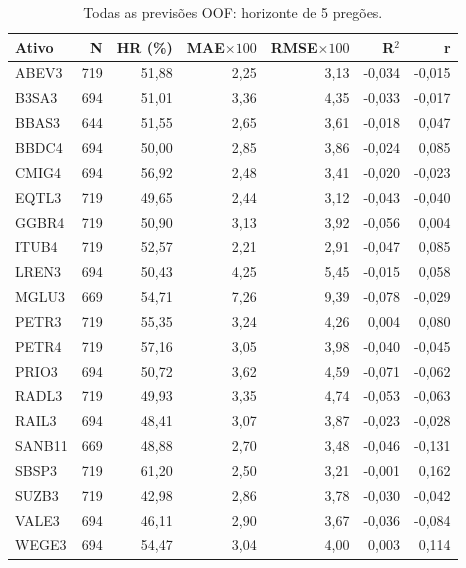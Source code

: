 \begin{table}[H]\centering
\caption{Todas as previsões OOF: horizonte de 5 pregões.}
{\footnotesize\begin{tabular}{lrrrrrr}\hline
Ativo & N & HR (\%) & MAE$\times100$ & RMSE$\times100$ & R$^2$ & r\\ \hline
ABEV3 & 719 & 51,88 & 2,25 & 3,13 & -0,034 & -0,015\\
B3SA3 & 694 & 51,01 & 3,36 & 4,35 & -0,033 & -0,017\\
BBAS3 & 644 & 51,55 & 2,65 & 3,61 & -0,018 & 0,047\\
BBDC4 & 694 & 50,00 & 2,85 & 3,86 & -0,024 & 0,085\\
CMIG4 & 694 & 56,92 & 2,48 & 3,41 & -0,020 & -0,023\\
EQTL3 & 719 & 49,65 & 2,44 & 3,12 & -0,043 & -0,040\\
GGBR4 & 719 & 50,90 & 3,13 & 3,92 & -0,056 & 0,004\\
ITUB4 & 719 & 52,57 & 2,21 & 2,91 & -0,047 & 0,085\\
LREN3 & 694 & 50,43 & 4,25 & 5,45 & -0,015 & 0,058\\
MGLU3 & 669 & 54,71 & 7,26 & 9,39 & -0,078 & -0,029\\
PETR3 & 719 & 55,35 & 3,24 & 4,26 & 0,004 & 0,080\\
PETR4 & 719 & 57,16 & 3,05 & 3,98 & -0,040 & -0,045\\
PRIO3 & 694 & 50,72 & 3,62 & 4,59 & -0,071 & -0,062\\
RADL3 & 719 & 49,93 & 3,35 & 4,74 & -0,053 & -0,063\\
RAIL3 & 694 & 48,41 & 3,07 & 3,87 & -0,023 & -0,028\\
SANB11 & 669 & 48,88 & 2,70 & 3,48 & -0,046 & -0,131\\
SBSP3 & 719 & 61,20 & 2,50 & 3,21 & -0,001 & 0,162\\
SUZB3 & 719 & 42,98 & 2,86 & 3,78 & -0,030 & -0,042\\
VALE3 & 694 & 46,11 & 2,90 & 3,67 & -0,036 & -0,084\\
WEGE3 & 694 & 54,47 & 3,04 & 4,00 & 0,003 & 0,114\\
\hline\end{tabular}}\par{}\end{table}

